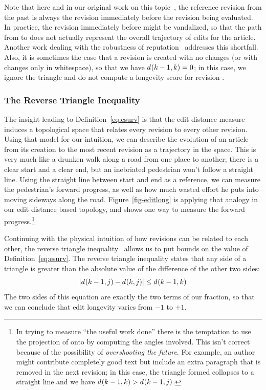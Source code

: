 Note that here and in our original work on
this topic~\cite{Adler2007}, the reference revision from the past is always
the revision immediately before the revision being evaluated.
In practice, the revision immediately before might be vandalized,
so that the path from  to  does not
actually represent the overall trajectory of edits for the
article.
Another work dealing with
the robustness of reputation~\cite{Chatterjee2008} addresses this
shortfall.
Also, it is sometimes the case that a revision is created with
no changes (or with changes only in whitespace), so that we
have $d_{}(k-1,k) = 0$; in this case, we ignore the triangle
and do not compute a longevity score for revision .

\subsubsection{The Reverse Triangle Inequality}

The insight leading to Definition~\ref{eq:esurv} is that the edit distance
measure induces a topological space that relates every revision to
every other revision.
Using that model for our intuition, we can describe the evolution of
an article from its creation to the most recent revision as a trajectory
in the space.
This is very much like a drunken walk along a road from one place to another;
there is a clear start and a clear end, but an inebriated
pedestrian won't follow a straight line.
Using the straight line between start and end as a reference,
we can measure the pedestrian's forward progress, as well as
how much wasted effort he puts into moving sideways along the road.
Figure~\ref{fig-editlong} is applying that analogy in our
edit distance based topology, and shows one way to measure
the forward progress.\footnote{%
  In trying to measure ``the useful work done'' there is the temptation
  to use the projection of  onto  by
  computing the angles involved.
  This isn't correct because of the possibility of \textit{overshooting the future}.
  For example, an author might contribute completely good text but include
  an extra paragraph that is removed in the next revision; in this case,
  the triangle formed collapses to a straight line and we have
  $d_{}(k-1,k) > d_{}(k-1,j)$.
}

Continuing with the physical intuition of how revisions can be
related to each other, the reverse triangle
inequality~\cite{wiki:TriangleInequality} allows us to put bounds
on the value of Definition~\ref{eq:esurv}.
The reverse triangle inequality states that any side of
a triangle is greater than the absolute value of the difference
of the other two sides:
\begin{equation}
| d_{}(k-1,j) - d_{}(k,j) | \le d_{}(k-1,k)
\end{equation}
The two sides of this equation are exactly the two terms
of our fraction, so that we can conclude that edit longevity
varies from $-1$ to $+1$.

